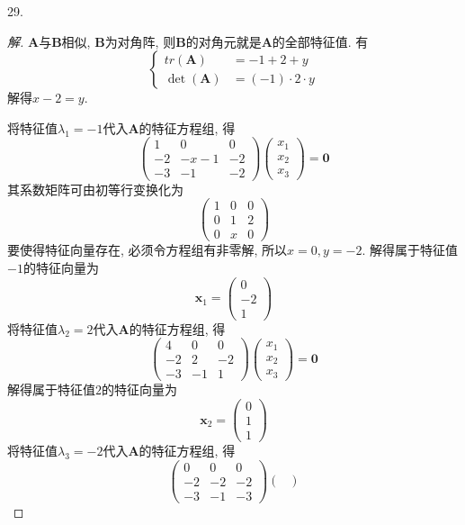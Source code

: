 \documentclass[10pt,a4paper]{report}
\def\*#1{\mathbf{#1}}
\begin{document}
29.
\begin{proof}[解]
	$\*A$与$\*B$相似, $\*B$为对角阵, 则$\*B$的对角元就是$\*A$的全部特征值. 有
	\[ \begin{cases}
	tr(\*A) &= -1+2+y \\
	\det(\*A) &= (-1)\cdot 2\cdot y
	\end{cases} \]
	解得$x-2=y$.
	
	将特征值$\lambda_1 = -1$代入$\*A$的特征方程组, 得
	\[ \begin{pmatrix}
	1 & 0 & 0 \\
	-2 & -x-1 & -2 \\
	-3 & -1 & -2
	\end{pmatrix}
	\begin{pmatrix}
	x_1 \\
	x_2 \\
	x_3
	\end{pmatrix} = \*0 \]
	其系数矩阵可由初等行变换化为
	\[ \begin{pmatrix}
	1 & 0 & 0 \\
	0 & 1 & 2 \\
	0 & x & 0
	\end{pmatrix}\]
	要使得特征向量存在, 必须令方程组有非零解, 所以$x=0, y=-2$. 解得属于特征值$-1$的特征向量为
	\[\*x_1 = \begin{pmatrix}
	0 \\
	-2 \\
	1
	\end{pmatrix}\]
	将特征值$\lambda_2 = 2$代入$\*A$的特征方程组, 得
	\[ \begin{pmatrix}
	4 & 0 & 0 \\
	-2 & 2 & -2 \\
	-3 & -1 & 1
	\end{pmatrix}
	\begin{pmatrix}
	x_1 \\
	x_2 \\
	x_3
	\end{pmatrix} = \*0 \]
	解得属于特征值$2$的特征向量为
	\[\*x_2 = \begin{pmatrix}
	0 \\
	1 \\
	1
	\end{pmatrix}\]
	将特征值$\lambda_3 = -2$代入$\*A$的特征方程组, 得
	\[\begin{pmatrix}
	0 & 0 & 0 \\
	-2 & -2 & -2 \\
	-3 & -1 & -3
	\end{pmatrix}
	\begin{pmatrix}

\end{pmatrix}\]
\end{proof}
\end{document}
